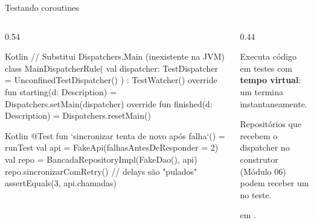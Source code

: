 \documentclass[aspectratio=169,10pt]{beamer}
\begin{document}
\begin{frame}[fragile]{Testando coroutines}
  \begin{columns}[T]
    \begin{column}{0.54\textwidth}
\begin{codigo}[title=MainDispatcherRule.kt]{Kotlin}
// Substitui Dispatchers.Main (inexistente na JVM)
class MainDispatcherRule(
  val dispatcher: TestDispatcher =
    UnconfinedTestDispatcher()
) : TestWatcher() {
  override fun starting(d: Description) =
    Dispatchers.setMain(dispatcher)
  override fun finished(d: Description) =
    Dispatchers.resetMain()
}
\end{codigo}
\begin{codigo}[title=Teste com runTest]{Kotlin}
@Test
fun `sincronizar tenta de novo após falha`() = runTest {
  val api = FakeApi(falhasAntesDeResponder = 2)
  val repo = BancadaRepositoryImpl(FakeDao(), api)
  repo.sincronizarComRetry()   // delays são "pulados"
  assertEquals(3, api.chamadas)
}
\end{codigo}
    \end{column}
    \begin{column}{0.44\textwidth}
      \begin{conceito}
        Executa código  em testes com \textbf{tempo virtual}: um  termina instantaneamente.
      \end{conceito}
      \begin{dica}
        Repositórios que recebem o dispatcher no construtor (Módulo 06) podem receber um  no teste.
      \end{dica}
      \begin{dica}[Dependência]
         em .
      \end{dica}
    \end{column}
  \end{columns}
\end{frame}
\end{document}
